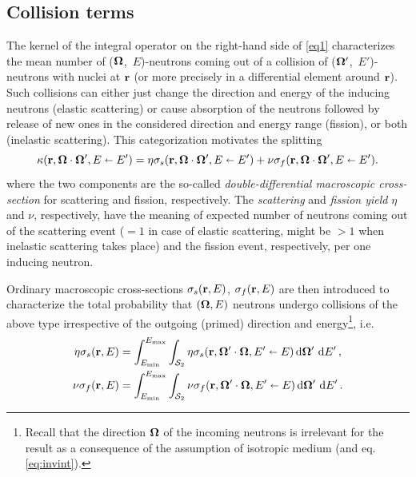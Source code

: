 \subsection{Collision terms}
The kernel of the integral operator on the right-hand side of \eqref{eq1} characterizes the mean number of
($\bomega$,~$E$)-neutrons coming out of a collision of ($\bomega'$,~$E'$)-neutrons with nuclei at $\br$ (or more
precisely in a differential element around $\br$). Such collisions can either just change the direction and energy of
the inducing neutrons (elastic scattering) or cause absorption of the neutrons followed by
release of new ones in the considered direction and energy range (fission), or both (inelastic
scattering).
This categorization motivates the splitting
\begin{equation}\label{eq:splitting}
  \kappa(\br,\bomega\cdot\bomega',E\sla E') = \eta\sigma_s(\br,\bomega\cdot\bomega',E\sla E') +
  \nu\sigma_f(\br,\bomega\cdot\bomega',E\sla E').
\end{equation}
where the two components are the so-called \textit{double-differential macroscopic
cross-section} for scattering and fission, respectively. 
The \textit{scattering} and \textit{fission yield} $\eta$ and $\nu$\index{$\eta$}, respectively, have the meaning of expected
number of neutrons coming out of the scattering event ($=1$ in case of elastic scattering, might be $> 1$ when inelastic
scattering takes place) and the fission event, respectively, per one inducing neutron.

Ordinary macroscopic cross-sections $\sigma_s(\br,E)$,
$\sigma_f(\br,E)$ are then introduced to characterize the total probability that $(\bomega,E)$ neutrons undergo 
collisions of the above type irrespective of the outgoing (primed) direction and energy\footnote{Recall that the
direction $\bomega$ of the incoming neutrons is irrelevant for the result as a consequence of the assumption of isotropic medium (and eq. \eqref{eq:invint}).}, i.e.
\begin{equation}\label{eq:ddifxs}
\begin{aligned}
\eta\sigma_s(\br, E) &=
\intE[']{\Emin}{\Emax}{\intA[']{\eta\sigma_s(\br,\bomega'\cdot\bomega, E'\sla E)}},\\
\nu\sigma_f(\br, E) &= \intE[']{\Emin}{\Emax}{\intA[']{\nu\sigma_f(\br,\bomega'\cdot\bomega, 
	E'\sla E)}}.
\end{aligned}
\end{equation}

